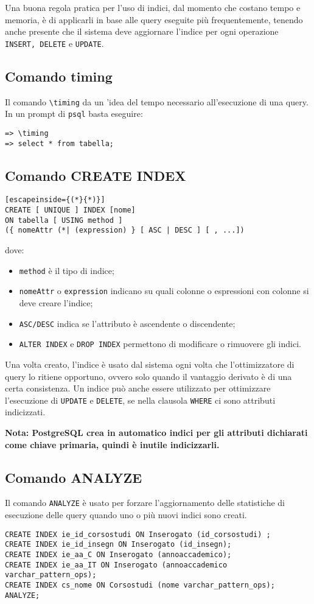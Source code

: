 \documentclass[a4paper, 10pt]{article}
\begin{document}
	Una buona regola pratica per l'uso di indici, dal momento che costano tempo e memoria, è di applicarli in base alle query eseguite più frequentemente, tenendo anche presente che il sistema deve aggiornare l'indice per ogni operazione \lstinline|INSERT, DELETE| e \lstinline|UPDATE|.
	
	\subsection{Comando timing}
	Il comando \lstinline|\timing| da un 'idea del tempo necessario all'esecuzione di una query.
	In un prompt di \verb|psql| basta eseguire:
	\begin{lstlisting}
=> \timing
=> select * from tabella;
	\end{lstlisting}

	\subsection{Comando CREATE INDEX} \label{createindex}
	\begin{lstlisting}[escapeinside={(*}{*)}]
CREATE [ UNIQUE ] INDEX [nome]
ON tabella [ USING method ]
({ nomeAttr (*| (expression) } [ ASC | DESC ] [ , ...])
	\end{lstlisting}
	dove:
	\begin{itemize}
		\item \verb|method| è il tipo di indice;
		\item \verb|nomeAttr| o \verb|expression| indicano su quali colonne o espressioni con colonne si deve creare l'indice;
		\item \lstinline|ASC/DESC| indica se l'attributo è ascendente o discendente;
		\item \lstinline|ALTER INDEX| e \lstinline|DROP INDEX| permettono di modificare o rimuovere gli indici.
	\end{itemize}

	Una volta creato, l'indice è usato dal sistema ogni volta che l'ottimizzatore di query lo ritiene opportuno, ovvero solo quando il vantaggio derivato è di una certa consistenza. Un indice può anche essere utilizzato per ottimizzare l'esecuzione di \lstinline|UPDATE| e \lstinline|DELETE|, se nella clausola \lstinline|WHERE| ci sono attributi indicizzati.
	
	\noindent
	\textbf{Nota: PostgreSQL crea in automatico indici per gli attributi dichiarati come chiave primaria, quindi è inutile indicizzarli.}
	
	\subsection{Comando ANALYZE}
	Il comando \lstinline|ANALYZE| è usato per forzare l'aggiornamento delle statistiche di esecuzione delle query quando uno o più nuovi indici sono creati.
	\begin{lstlisting}
CREATE INDEX ie_id_corsostudi ON Inserogato (id_corsostudi) ;
CREATE INDEX ie_id_insegn ON Inserogato (id_insegn);
CREATE INDEX ie_aa_C ON Inserogato (annoaccademico);
CREATE INDEX ie_aa_IT ON Inserogato (annoaccademico varchar_pattern_ops);
CREATE INDEX cs_nome ON Corsostudi (nome varchar_pattern_ops);
ANALYZE;
	\end{lstlisting}
	
\end{document}
